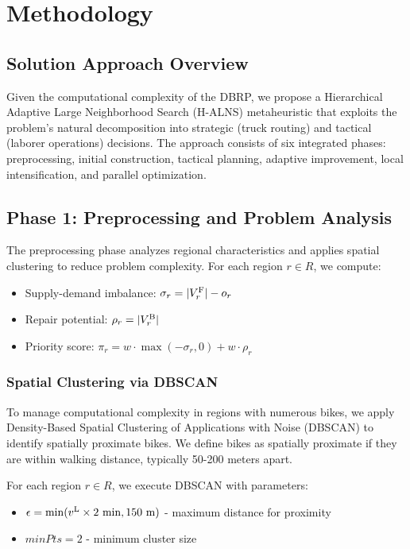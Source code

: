 \section{Methodology}

\subsection{Solution Approach Overview}

Given the computational complexity of the DBRP, we propose a Hierarchical Adaptive Large Neighborhood Search (H-ALNS) metaheuristic that exploits the problem's natural decomposition into strategic (truck routing) and tactical (laborer operations) decisions. The approach consists of six integrated phases: preprocessing, initial construction, tactical planning, adaptive improvement, local intensification, and parallel optimization.

\subsection{Phase 1: Preprocessing and Problem Analysis}

The preprocessing phase analyzes regional characteristics and applies spatial clustering to reduce problem complexity. For each region $r \in R$, we compute:

\begin{itemize}
    \item Supply-demand imbalance: $\sigma_r = |V_r^{\text{F}}| - o_r$
    \item Repair potential: $\rho_r = |V_r^{\text{B}}|$
    \item Priority score: $\pi_r = w \cdot \max(-\sigma_r, 0) + w \cdot \rho_r$
\end{itemize}

\subsubsection{Spatial Clustering via DBSCAN}
To manage computational complexity in regions with numerous bikes, we apply Density-Based Spatial Clustering of Applications with Noise (DBSCAN) to identify spatially proximate bikes. We define bikes as spatially proximate if they are within walking distance, typically 50-200 meters apart.

For each region $r \in R$, we execute DBSCAN with parameters:
\begin{itemize}
    \item $\epsilon = \min(v^{\text{L}} \times 2 \text{ min}, 150 \text{ m})$ - maximum distance for proximity
    \item $minPts = 2$ - minimum cluster size
\end{itemize}

